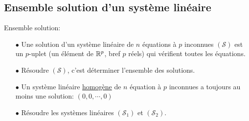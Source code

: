 \documentclass[a4paper, 11pt]{article}
\begin{document}
\subsection{Ensemble solution d'un syst\`eme lin\'eaire}


\vspace{0.4cm}

{\noindent  

\begin{defi} Ensemble solution: 
\begin{itemize}
\item[$\bullet$] Une solution d'un syst\`eme lin\'eaire de $n$ \'equations \`a $p$ inconnues $(\mathcal{S})$ est un $p$-uplet (un élément de $\mathbb{R}^p$, bref $p$ réels) qui vérifient toutes les équations.
\item[$\bullet$] 
R\'esoudre $(\mathcal{S})$, c'est d\'eterminer l'ensemble des solutions.
\end{itemize}
\end{defi}

}


\begin{exemples} 
\begin{itemize}
\item[$\bullet$] Un syst\`eme lin\'eaire \underline{homog\`ene} de $n$ \'equation \`a $p$ inconnues a toujours au moins une solution: $(0,0,\cdots,0)$
\item[$\bullet$] R\'esoudre les syst\`emes lin\'eaires $(\mathcal{S}_1)$ et $(\mathcal{S}_2)$.
\end{itemize}
\end{exemples}

\vspace{0.4cm}

\end{document}
